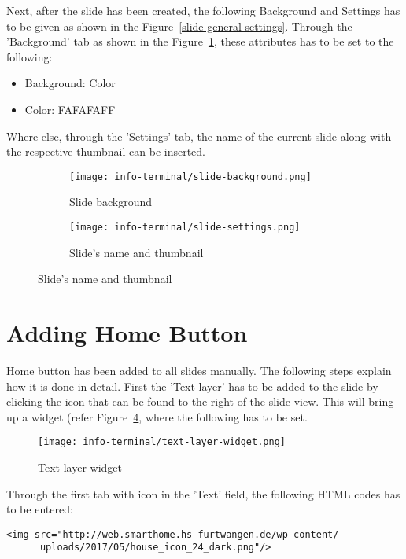 Next, after the slide has been created, the following Background and Settings has to be given as shown in the Figure~\ref{slide-general-settings}. Through the 'Background' tab as shown in the Figure~\ref{slide-background}, these attributes has to be set to the following:
\begin{itemize}
\item Background: Color
\item Color: FAFAFAFF
\end{itemize}
Where else, through the 'Settings' tab, the name of the current slide along with the respective thumbnail can be inserted.
\begin{figure}[ht]
\caption{Slide settings}
\label{slide-general-settings}
\centering
	\begin{subfigure}{.49\linewidth}
	\caption{Slide background}
	\label{slide-background}
	\centering
	\texttt{[image: info-terminal/slide-background.png]}
	\end{subfigure}
	\begin{subfigure}{.49\linewidth}
	\caption{Slide's name and thumbnail}
	\label{slide-settings}
	\centering
	\texttt{[image: info-terminal/slide-settings.png]}
	\end{subfigure}
\end{figure}

\section{Adding Home Button}
Home button has been added to all slides manually. The following steps explain how it is done in detail. First the 'Text layer' has to be added to the slide by clicking the  icon that can be found to the right of the slide view. This will bring up a widget (refer Figure~\ref{text-layer-widget}, where the following has to be set.
\begin{figure}[ht]
\caption{Text layer widget}
\label{text-layer-widget}
\centering
\texttt{[image: info-terminal/text-layer-widget.png]}
\end{figure}

Through the first tab with icon  in the 'Text' field, the following HTML codes has to be entered:
\begin{lstlisting}
<img src="http://web.smarthome.hs-furtwangen.de/wp-content/
      uploads/2017/05/house_icon_24_dark.png"/>
\end{lstlisting}

